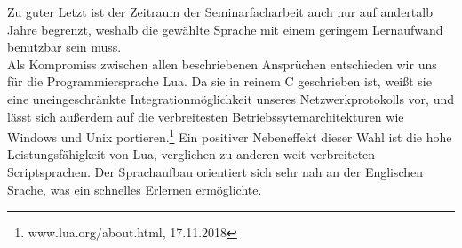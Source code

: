 \documentclass[12pt, a4paper]{scrartcl}
\begin{document}
Zu guter Letzt ist der Zeitraum der Seminarfacharbeit auch nur auf andertalb Jahre begrenzt, weshalb die gewählte Sprache mit einem geringem Lernaufwand benutzbar sein muss.\\
Als Kompromiss zwischen allen beschriebenen Ansprüchen entschieden wir uns für die Programmiersprache Lua. Da sie in reinem C geschrieben ist, weißt sie eine uneingeschränkte Integrationmöglichkeit unseres Netzwerkprotokolls vor, und lässt sich außerdem auf die verbreitesten Betriebssytemarchitekturen wie Windows und Unix portieren.\footnote{www.lua.org/about.html, 17.11.2018} Ein positiver Nebeneffekt dieser Wahl ist die hohe Leistungsfähigkeit von Lua, verglichen zu anderen weit verbreiteten Scriptsprachen. Der Sprachaufbau orientiert sich sehr nah an der Englischen Srache, was ein schnelles Erlernen ermöglichte. 
\end{document}

